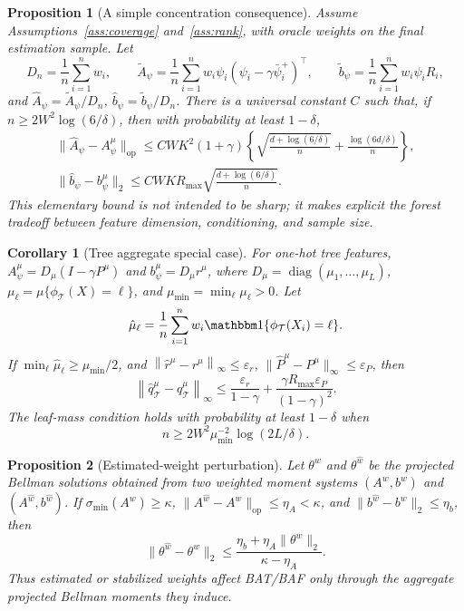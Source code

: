 \documentclass{article}
\DeclareMathOperator{\diag}{diag}
\newcommand{\cT}{\mathcal T}
\newcommand{\one}{\mathbbm 1}
\newcommand{\linf}[1]{\left\lVert #1 \right\rVert_\infty}
\newcommand{\hatP}{\widehat P}
\newcommand{\hatr}{\widehat r}
\newcommand{\hatq}{\widehat q}
\newcommand{\hatA}{\widehat A}
\newcommand{\hatb}{\widehat b}
\newcommand{\tildeA}{\widetilde A}
\newcommand{\tildeb}{\widetilde b}
\theoremstyle{plain}
\newtheorem{corollary}{Corollary}
\newtheorem{proposition}{Proposition}
\theoremstyle{definition}
\theoremstyle{remark}
\begin{document}
\begin{proposition}[A simple concentration consequence]
\label{prop:concentration}
Assume Assumptions~\ref{ass:coverage} and~\ref{ass:rank}, with oracle weights
on the final estimation sample. Let
\[
  D_n=\frac1n\sum_{i=1}^n w_i,
  \qquad
  \tildeA_\psi=\frac1n\sum_{i=1}^n
  w_i\psi_i(\psi_i-\gamma\bar\psi_i^+)^\top,
  \qquad
  \tildeb_\psi=\frac1n\sum_{i=1}^n w_i\psi_iR_i,
\]
and \(\hatA_\psi=\tildeA_\psi/D_n\),
\(\hatb_\psi=\tildeb_\psi/D_n\). There is a universal constant \(C\) such
that, if \(n\ge 2W^2\log(6/\delta)\), then with probability at least
\(1-\delta\),
\begin{align*}
  \|\hatA_\psi-A^\mu_\psi\|_{\mathrm{op}}
  \le
  C WK^2(1+\gamma)
  \left\{
    \sqrt{\frac{d+\log(6/\delta)}{n}}
    +
    \frac{\log(6d/\delta)}{n}
  \right\},\\
  \|\hatb_\psi-b^\mu_\psi\|_2
  \le
  C WKR_{\max}
  \sqrt{\frac{d+\log(6/\delta)}{n}} .
\end{align*}
This elementary bound is not intended to be sharp; it makes explicit the
forest tradeoff between feature dimension, conditioning, and sample size.
\end{proposition}

\begin{corollary}[Tree aggregate special case]
\label{cor:tree}
For one-hot tree features, \(A^\mu_\psi=D_\mu(I-\gamma P^\mu)\) and
\(b^\mu_\psi=D_\mu r^\mu\), where
\(D_\mu=\diag(\mu_1,\ldots,\mu_L)\),
\(\mu_\ell=\mu\{\phi_{\cT}(X)=\ell\}\), and
\(\mu_{\min}=\min_\ell\mu_\ell>0\). Let
\[
  \hat\mu_\ell=\frac1n\sum_{i=1}^n
  w_i\one\{\phi_{\cT}(X_i)=\ell\}.
\]
If \(\min_\ell\hat\mu_\ell\ge \mu_{\min}/2\), and
\(\linf{\hatr^\mu-r^\mu}\le\varepsilon_r\),
\(\|\hatP^\mu-P^\mu\|_\infty\le\varepsilon_P\), then
\[
  \linf{\hatq^\mu_{\cT}-q^\mu_{\cT}}
  \le
  \frac{\varepsilon_r}{1-\gamma}
  +
  \frac{\gamma R_{\max}\varepsilon_P}{(1-\gamma)^2}.
\]
The leaf-mass condition holds with probability at least \(1-\delta\) when
\[
  n\ge 2W^2\mu_{\min}^{-2}\log(2L/\delta).
\]
\end{corollary}

\begin{proposition}[Estimated-weight perturbation]
\label{prop:weight_perturbation}
Let \(\theta^w\) and \(\theta^{\hat w}\) be the projected Bellman solutions
obtained from two weighted moment systems \((A^w,b^w)\) and
\((A^{\hat w},b^{\hat w})\). If
\(\sigma_{\min}(A^w)\ge\kappa\),
\(\|A^{\hat w}-A^w\|_{\mathrm{op}}\le\eta_A<\kappa\), and
\(\|b^{\hat w}-b^w\|_2\le\eta_b\), then
\[
  \|\theta^{\hat w}-\theta^w\|_2
  \le
  \frac{\eta_b+\eta_A\|\theta^w\|_2}{\kappa-\eta_A}.
\]
Thus estimated or stabilized weights affect BAT/BAF only through the aggregate
projected Bellman moments they induce.
\end{proposition}
\end{document}
